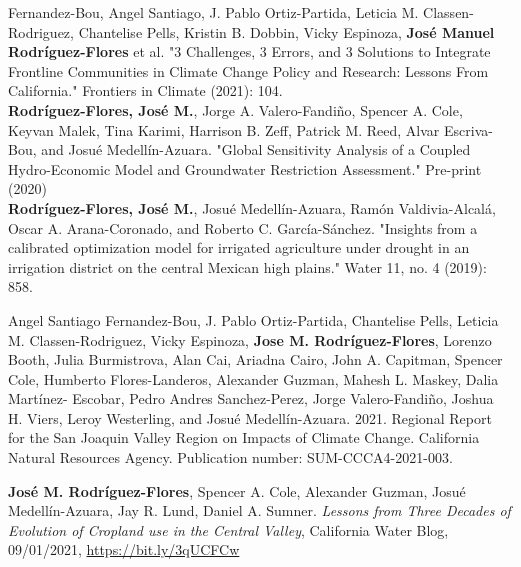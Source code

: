 \documentclass[a4paper,12pt]{memoir} %
\begin{document}
\clearpage %
\userinformation %
\framebreak %





Fernandez-Bou, Angel Santiago, J. Pablo Ortiz-Partida, Leticia M. Classen-Rodriguez, Chantelise Pells, Kristin B. Dobbin, Vicky Espinoza, \textbf{José Manuel Rodríguez-Flores} et al. "3 Challenges, 3 Errors, and 3 Solutions to Integrate Frontline Communities in Climate Change Policy and Research: Lessons From California." Frontiers in Climate (2021): 104.\\

\textbf{Rodríguez-Flores, José M.}, Jorge A. Valero-Fandiño, Spencer A. Cole, Keyvan Malek, Tina Karimi, Harrison B. Zeff, Patrick M. Reed, Alvar Escriva-Bou, and Josué Medellín-Azuara. "Global Sensitivity Analysis of a Coupled Hydro-Economic Model and Groundwater Restriction Assessment." Pre-print (2020)\\

\textbf{Rodríguez-Flores, José M.}, Josué Medellín-Azuara, Ramón Valdivia-Alcalá, Oscar A. Arana-Coronado, and Roberto C. García-Sánchez. "Insights from a calibrated optimization model for irrigated agriculture under drought in an irrigation district on the central Mexican high plains." Water 11, no. 4 (2019): 858.\\


Angel Santiago Fernandez-Bou, J. Pablo Ortiz-Partida, Chantelise Pells, Leticia M. Classen-Rodriguez,
Vicky Espinoza, \textbf{Jose M. Rodríguez-Flores}, Lorenzo Booth, Julia Burmistrova, Alan Cai, Ariadna Cairo, John A. Capitman, Spencer Cole, Humberto Flores-Landeros, Alexander Guzman, Mahesh L. Maskey, Dalia Martínez-
Escobar, Pedro Andres Sanchez-Perez, Jorge Valero-Fandiño, Joshua H. Viers, Leroy Westerling, and Josué Medellín-Azuara. 2021. Regional Report for the San Joaquin Valley Region on Impacts of Climate Change. California Natural Resources Agency. Publication number: SUM-CCCA4-2021-003.\\


\textbf{José M. Rodríguez-Flores}, Spencer A. Cole, Alexander Guzman, Josué Medellín-Azuara, Jay R. Lund, Daniel A. Sumner. \textit{Lessons from Three Decades of Evolution of Cropland use in the Central Valley}, California Water Blog, 09/01/2021, \url{https://bit.ly/3qUCFCw}\\
\end{document}
